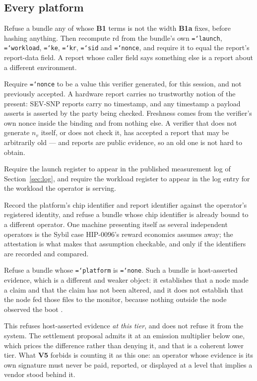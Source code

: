 \documentclass[11pt,a4paper]{article}
\newcommand{\code}[1]{\texttt{\hyphenchar\font=`\-\relax #1}}
\newcommand{\req}[1]{\textbf{#1}}
\begin{document}
\subsection{Every platform}

\begin{description}[leftmargin=1.6em]
\item[\req{V1}] Refuse a bundle any of whose \req{B1} terms is not the width
\req{B1a} fixes, before hashing anything. Then recompute $\mathrm{rd}$ from the
bundle's own \code{launch}, \code{workload}, \code{ke}, \code{kr}, \code{sid} and
\code{nonce}, and require it to equal the report's report-data field. A report whose
caller field says something else is a report about a different environment.

\item[\req{V2}] Require \code{nonce} to be a value this verifier generated, for
this session, and not previously accepted. A hardware report carries no
trustworthy notion of the present: SEV-SNP reports carry no timestamp, and any
timestamp a payload asserts is asserted by the party being checked. Freshness comes
from the verifier's own nonce inside the binding and from nothing else. A verifier
that does not generate $n_v$ itself, or does not check it, has accepted a report
that may be arbitrarily old --- and reports are public evidence, so an old one is
not hard to obtain.

\item[\req{V3}] Require the launch register to appear in the published measurement
log of Section~\ref{sec:log}, and require the workload register to appear in the
log entry for the workload the operator is serving.

\item[\req{V4}] Record the platform's chip identifier and report identifier against
the operator's registered identity, and refuse a bundle whose chip identifier is
already bound to a different operator. One machine presenting itself as several
independent operators is the Sybil case HIP-0096's reward economics assumes away;
the attestation is what makes that assumption checkable, and only if the
identifiers are recorded and compared.

\item[\req{V5}] Refuse a bundle whose \code{platform} is \code{none}. Such a bundle
is host-asserted evidence, which is a different and weaker object: it establishes
that a node made a claim and that the claim has not been altered, and it does not
establish that the node fed those files to the monitor, because nothing outside the
node observed the boot \cite{hanzod}.

This refuses host-asserted evidence \emph{at this tier}, and does not refuse it from
the system. The settlement proposal \cite{hipsettle} admits it at an emission
multiplier below one, which prices the difference rather than denying it, and that is
a coherent lower tier. What \req{V5} forbids is counting it as this one: an operator
whose evidence is its own signature must never be paid, reported, or displayed at a
level that implies a vendor stood behind it.
\end{description}
\end{document}
